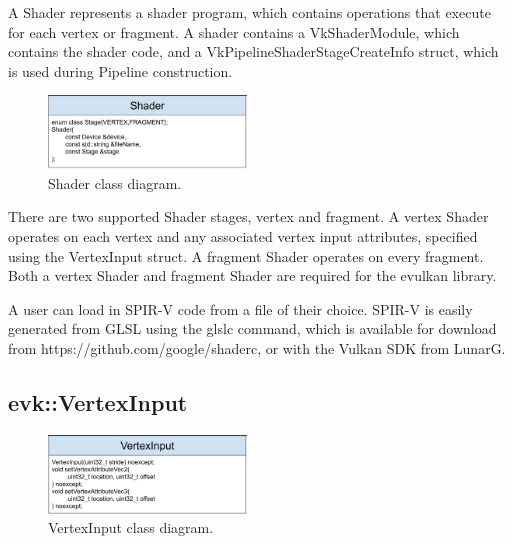 \documentclass[12pt]{report}
\newcommand{\figurewidth}{0.55\textwidth}
\newcommand{\imagewidth}{0.47\textwidth}
\theoremstyle{definition}
\begin{document}
        A Shader represents a shader program, which contains operations that
        execute for each vertex or fragment. A shader contains a
        VkShaderModule, which contains the shader code, and a
        VkPipelineShaderStageCreateInfo struct, which is used during
        Pipeline construction.

        \begin{figure}
          \centering
          \includegraphics[width=\imagewidth]{images/class_shader.png}
          \caption{Shader class diagram.}
          \label{fig:class_shader}
        \end{figure}

        There are two supported Shader stages, vertex and fragment. A
        vertex Shader operates on each vertex and any associated vertex
        input attributes, specified using the VertexInput struct. A
        fragment Shader operates on every fragment. Both a vertex Shader
        and fragment Shader are required for the evulkan library.

        A user can load in SPIR-V code from a file of their choice. SPIR-V is
        easily generated from GLSL using the glslc command, which is
        available for download from https://github.com/google/shaderc, or
        with the Vulkan SDK from LunarG.

      \subsection{evk::VertexInput}

        \begin{figure}[h]
          \centering
          \includegraphics[width=\imagewidth]{images/class_vertexinput.png}
          \caption{VertexInput class diagram.}
          \label{fig:class_vertexinput}
        \end{figure}
\end{document}
